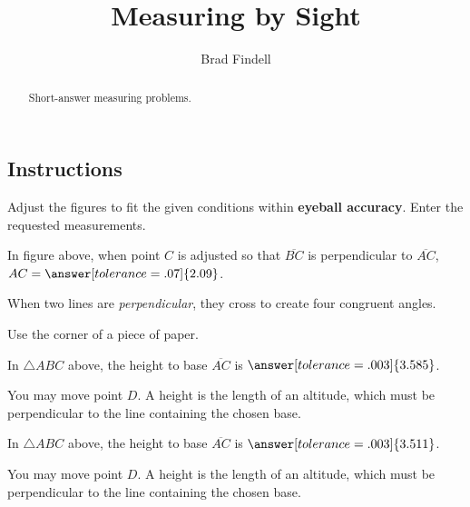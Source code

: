 \documentclass[nooutcomes]{ximera}
\title{Measuring by Sight}
\author{Brad Findell}
\begin{document}
\begin{abstract}
Short-answer measuring problems.
\end{abstract}
\maketitle

\subsection*{Instructions}
Adjust the figures to fit the given conditions within \textbf{eyeball accuracy}.  Enter the requested measurements.  

\begin{problem}
\begin{center}  
\end{center}
In figure above, when point $C$ is adjusted so that $\overline{BC}$ is perpendicular to $\overline{AC}$, $AC=\answer[tolerance=.07]{2.09}$.
\begin{hint}
When two lines are \emph{perpendicular}, they cross to create four congruent angles. 
\end{hint}
\begin{hint}
Use the corner of a piece of paper.
\end{hint}
\end{problem}

\begin{problem}
\begin{center}  
\end{center}
In $\triangle ABC$ above, the height to base $\overline{AC}$ is $\answer[tolerance=.003]{3.585}$.
\begin{hint}
You may move point $D$.  A height is the length of an altitude, which must be perpendicular to the line containing the chosen base.  
\end{hint}
\end{problem}

\begin{problem}
\begin{center}  
\end{center}
In $\triangle ABC$ above, the height to base $\overline{AC}$ is $\answer[tolerance=.003]{3.511}$.
\begin{hint}
You may move point $D$.  A height is the length of an altitude, which must be perpendicular to the line containing the chosen base.  
\end{hint}
\end{problem}
\end{document}
